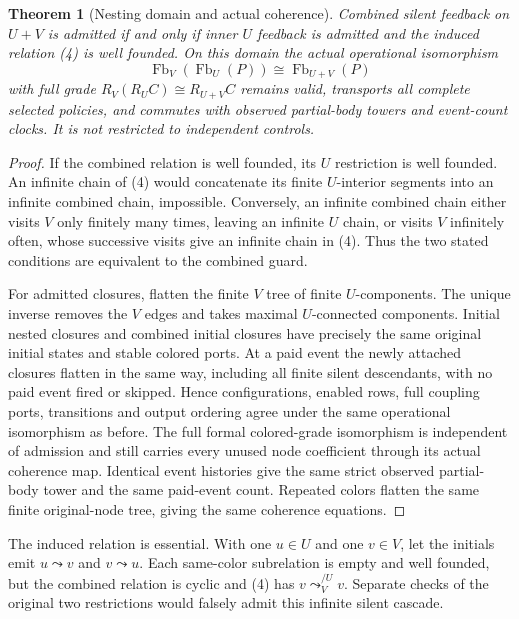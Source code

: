 \documentclass[11pt]{article}
\newtheorem{theorem}{Theorem}\newtheorem{proposition}[theorem]{Proposition}
\begin{document}
\begin{theorem}[Nesting domain and actual coherence]
Combined silent feedback on $U+V$ is admitted if and only if inner $U$ feedback is admitted and the induced relation (4) is well founded. On this domain the actual operational isomorphism
\[
 \operatorname{Fb}_V(\operatorname{Fb}_U(P))
 \cong\operatorname{Fb}_{U+V}(P)
\]
with full grade $R_V(R_UC)\cong R_{U+V}C$ remains valid, transports all complete selected policies, and commutes with observed partial-body towers and event-count clocks. It is not restricted to independent controls.
\end{theorem}
\begin{proof}
If the combined relation is well founded, its $U$ restriction is well founded. An infinite chain of (4) would concatenate its finite $U$-interior segments into an infinite combined chain, impossible. Conversely, an infinite combined chain either visits $V$ only finitely many times, leaving an infinite $U$ chain, or visits $V$ infinitely often, whose successive visits give an infinite chain in (4). Thus the two stated conditions are equivalent to the combined guard.

For admitted closures, flatten the finite $V$ tree of finite $U$-components. The unique inverse removes the $V$ edges and takes maximal $U$-connected components. Initial nested closures and combined initial closures have precisely the same original initial states and stable colored ports. At a paid event the newly attached closures flatten in the same way, including all finite silent descendants, with no paid event fired or skipped. Hence configurations, enabled rows, full coupling ports, transitions and output ordering agree under the same operational isomorphism as before. The full formal colored-grade isomorphism is independent of admission and still carries every unused node coefficient through its actual coherence map. Identical event histories give the same strict observed partial-body tower and the same paid-event count. Repeated colors flatten the same finite original-node tree, giving the same coherence equations.
\end{proof}

The induced relation is essential. With one $u\in U$ and one $v\in V$, let the initials emit $u\leadsto v$ and $v\leadsto u$. Each same-color subrelation is empty and well founded, but the combined relation is cyclic and (4) has $v\leadsto^{/U}_Vv$. Separate checks of the original two restrictions would falsely admit this infinite silent cascade.
\end{document}
